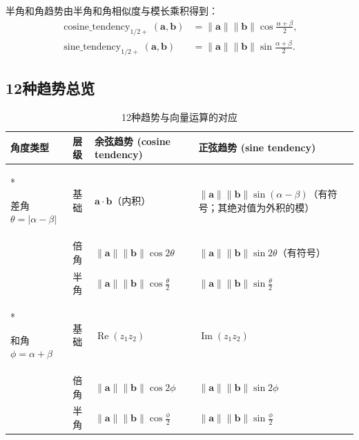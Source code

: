 \begin{definition}[半角和角趋势]\label{def:half_sum_tendency}
半角和角趋势由半角和角相似度与模长乘积得到：
\begin{align*}
\operatorname{cosine\_tendency}_{1/2+}(\mathbf{a}, \mathbf{b}) &= \|\mathbf{a}\| \|\mathbf{b}\| \cos\frac{\alpha + \beta}{2}, \\
\operatorname{sine\_tendency}_{1/2+}(\mathbf{a}, \mathbf{b}) &= \|\mathbf{a}\| \|\mathbf{b}\| \sin\frac{\alpha + \beta}{2}.
\end{align*}
\end{definition}

\subsection{\texorpdfstring{12种趋势总览}{12种趋势总览}}

\begin{table}[htbp]
    \centering
    \caption{12种趋势与向量运算的对应}
    \label{tab:tendency_spectrum}
    \begin{tabularx}{\textwidth}{>{\centering\arraybackslash}p{2.4cm}
                                >{\centering\arraybackslash}p{1.4cm}
                                >{\centering\arraybackslash}X
                                >{\centering\arraybackslash}X}
        \toprule
        角度类型 & 层级 & 余弦趋势 (cosine tendency) & 正弦趋势 (sine tendency) \\
        \midrule
        \multirow{3}*{\parbox{2.0cm}{\centering 差角 $\theta=\lvert\alpha-\beta\rvert$}}
        & 基础 & $\mathbf{a} \cdot \mathbf{b}$（内积） & $\|\mathbf{a}\| \|\mathbf{b}\| \sin(\alpha-\beta)$（有符号；其绝对值为外积的模） \\
        & 倍角 & $\|\mathbf{a}\| \|\mathbf{b}\| \cos 2\theta$ & $\|\mathbf{a}\| \|\mathbf{b}\| \sin 2\theta$（有符号） \\
        & 半角 & $\|\mathbf{a}\| \|\mathbf{b}\| \cos\frac{\theta}{2}$ & $\|\mathbf{a}\| \|\mathbf{b}\| \sin\frac{\theta}{2}$ \\
        \midrule
        \multirow{3}*{\parbox{2.0cm}{\centering 和角 $\phi=\alpha+\beta$}}
        & 基础 & $\operatorname{Re}(z_1 z_2)$ & $\operatorname{Im}(z_1 z_2)$ \\
        & 倍角 & $\|\mathbf{a}\| \|\mathbf{b}\| \cos 2\phi$ & $\|\mathbf{a}\| \|\mathbf{b}\| \sin 2\phi$ \\
        & 半角 & $\|\mathbf{a}\| \|\mathbf{b}\| \cos\frac{\phi}{2}$ & $\|\mathbf{a}\| \|\mathbf{b}\| \sin\frac{\phi}{2}$ \\
        \bottomrule
    \end{tabularx}
\end{table}


